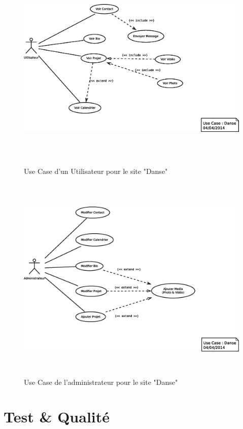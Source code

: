 \documentclass[11pt,a4paper]{report}
\begin{document}
			\begin{figure}[H]
				\centering
				\includegraphics[height=10cm]{UseCase-Danse-User.eps}
				\caption[Use Case Utilisateur Danse]{Use Case d'un Utilisateur pour le site "Danse"}
				\label{fig:UseCase-Danse_User}
			\end{figure}
			\begin{figure}[H]
				\centering
				\includegraphics[height=10cm]{UseCase-Danse-Administrateur.eps}
				\caption[Use Case Administrateur Danse]{Use Case de l'administrateur pour le site "Danse"}
				\label{fig:UseCase-Danse_Admin}
			\end{figure}
				
	\section{Test \& Qualité}
\end{document}
